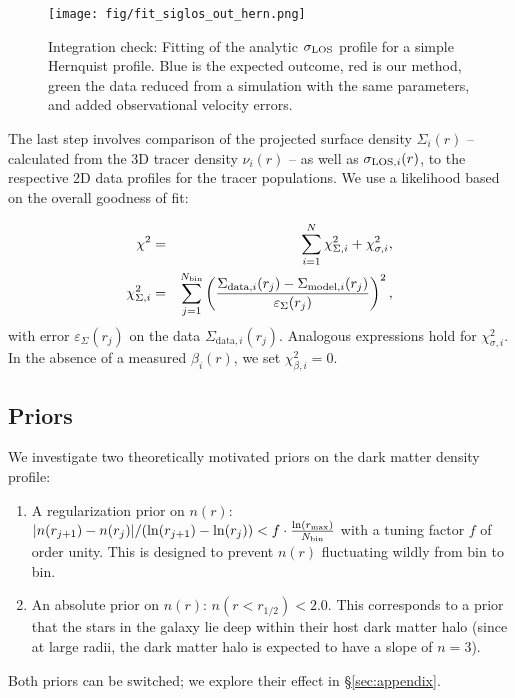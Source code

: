 \begin{figure}
    \begin{center}
        \hspace{-7mm}
        \texttt{[image: fig/fit\_siglos\_out\_hern.png]}
        \caption{Integration check: Fitting of the analytic $\sigma_{\text{LOS}}$
          profile for a simple Hernquist profile. Blue is the expected
          outcome, red is our method, green the data reduced from a
          simulation with the same parameters, and added observational
          velocity errors.}
        \label{fig:hern_comparison}
    \end{center}
\end{figure}


The last step involves comparison of the projected surface density $\Sigma_i(r)$
-- calculated from the 3D tracer density $\nu_i(r)$ -- as well as $\sigma_{{\rm
    LOS},i}(r)$, to the respective 2D data profiles for the tracer
populations. We use a likelihood based on the overall goodness of fit:

\begin{eqnarray}
    \chi^2 &=& \sum_{i=1}^N \chi_{\Sigma,i}^2 + \chi_{\sigma,i}^2,\\
    \chi_{\Sigma,i}^2 &=& \sum_{j=1}^{N_{\rm bin}} \left(\frac{\Sigma_{\text{data},i}(r_j)-\Sigma_{\text{model},i}(r_j)}{\varepsilon_\Sigma(r_j)}\right)^2,
\end{eqnarray}
with error $\varepsilon_\Sigma(r_j)$ on the data
$\Sigma_{\text{data},i}(r_j)$. Analogous expressions hold for
$\chi_{\sigma,i}^2$. In the absence of a
measured $\beta_i(r)$, we set $\chi_{\beta,i}^2=0$.

\subsection{Priors}

We investigate two theoretically motivated priors on the dark matter density
profile:

\begin{enumerate}
    \item A regularization prior on $n(r)$:
    $|n(r_{j+1})-n(r_{j})|/(\ln(r_{j+1})-\ln(r_{j}))<f\cdot\frac{\ln(r_{\rm
        max})}{N_{\rm bin}}$ with a tuning factor $f$ of order
    unity. This is designed to prevent $n(r)$ fluctuating wildly from bin to bin.

    \item An absolute prior on $n(r)$: $n(r<r_{1/2})<2.0$. This corresponds to a
    prior that the stars in the galaxy lie deep within their host dark matter
    halo (since at large radii, the dark matter halo is expected to have a slope
    of $n = 3$).
\end{enumerate}
Both priors can be switched; we explore their effect in \S\ref{sec:appendix}.


